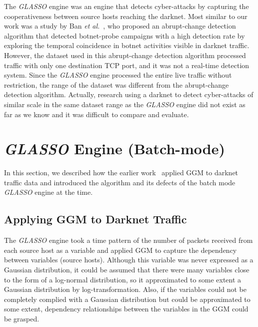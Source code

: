 \documentclass[conference]{IEEEtran}
\begin{document}
The {\it GLASSO} engine was an engine that detects cyber-attacks by capturing the cooperativeness between source hosts reaching the darknet.
Most similar to our work was a study by Ban {\it et al.}~\cite{Ban}, who proposed an abrupt-change detection algorithm that detected botnet-probe campaigns with a high detection rate by exploring the temporal coincidence in botnet activities visible in darknet traffic.
However, the dataset used in this abrupt-change detection algorithm processed traffic with only one destination TCP port, and it was not a real-time detection system.
Since the {\it GLASSO} engine processed the entire live traffic without restriction, the range of the dataset was different from the abrupt-change detection algorithm.
Actually, research using a darknet to detect cyber-attacks of similar scale in the same dataset range as the {\it GLASSO} engine did not exist as far as we know and it was difficult to compare and evaluate.




\section{{\it GLASSO} Engine (Batch-mode)}
In this section, we described how the earlier work~\cite{Han} applied GGM to darknet traffic data and introduced the algorithm and its defects of the batch mode {\it GLASSO} engine at the time.


\subsection{Applying GGM to Darknet Traffic}
The {\it GLASSO} engine took a time pattern of the number of packets received from each source host as a variable and applied GGM to capture the dependency between variables (source hosts).
Although this variable was never expressed as a Gaussian distribution, it could be assumed that there were many variables close to the form of a log-normal distribution, so it approximated to some extent a Gaussian distribution by log-transformation.
Also, if the variables could not be completely complied with a Gaussian distribution but could be approximated to some extent, dependency relationships between the variables in the GGM could be grasped.
\end{document}
